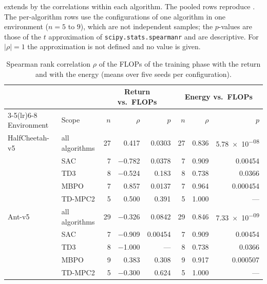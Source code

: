  extends  by the correlations within each algorithm.
The pooled rows reproduce .
The per-algorithm rows use the configurations of one algorithm in one environment ($n=5$ to $9$), which are not independent samples; the $p$-values are those of the $t$ approximation of \texttt{scipy.stats.spearmanr} and are descriptive.
For $|\rho|=1$ the approximation is not defined and no value is given.

\begin{table}[tbp]
  \centering
  \footnotesize
  \caption{Spearman rank correlation $\rho$ of the FLOPs of the training phase with the return and with the energy (means over five seeds per configuration).}
  \label{tab:app-spearman}
  \begin{tabular}{@{}llrrrrrr@{}}
    \toprule
                   &           & \multicolumn{3}{c}{Return vs.\ FLOPs} & \multicolumn{3}{c}{Energy vs.\ FLOPs}                                        \\
    \cmidrule(lr){3-5}\cmidrule(lr){6-8}
    Environment    & Scope     & $n$                                   & $\rho$                                & $p$       & $n$ & $\rho$   & $p$       \\
    \midrule
    HalfCheetah-v5 & all algorithms & \num{27} & \num{0.417} & \num{0.0303} & \num{27} & \num{0.836} & \num{5.78e-08} \\
     & SAC & \num{7} & \num{-0.782} & \num{0.0378} & \num{7} & \num{0.909} & \num{0.00454} \\
     & TD3 & \num{8} & \num{-0.524} & \num{0.183} & \num{8} & \num{0.738} & \num{0.0366} \\
     & MBPO & \num{7} & \num{0.857} & \num{0.0137} & \num{7} & \num{0.964} & \num{0.000454} \\
     & TD-MPC2 & \num{5} & \num{0.500} & \num{0.391} & \num{5} & \num{1.000} & --- \\
    \midrule
    Ant-v5 & all algorithms & \num{29} & \num{-0.326} & \num{0.0842} & \num{29} & \num{0.846} & \num{7.33e-09} \\
     & SAC & \num{7} & \num{-0.909} & \num{0.00454} & \num{7} & \num{0.909} & \num{0.00454} \\
     & TD3 & \num{8} & \num{-1.000} & --- & \num{8} & \num{0.738} & \num{0.0366} \\
     & MBPO & \num{9} & \num{0.383} & \num{0.308} & \num{9} & \num{0.917} & \num{0.000507} \\
     & TD-MPC2 & \num{5} & \num{-0.300} & \num{0.624} & \num{5} & \num{1.000} & --- \\
    \bottomrule
  \end{tabular}
\end{table}

